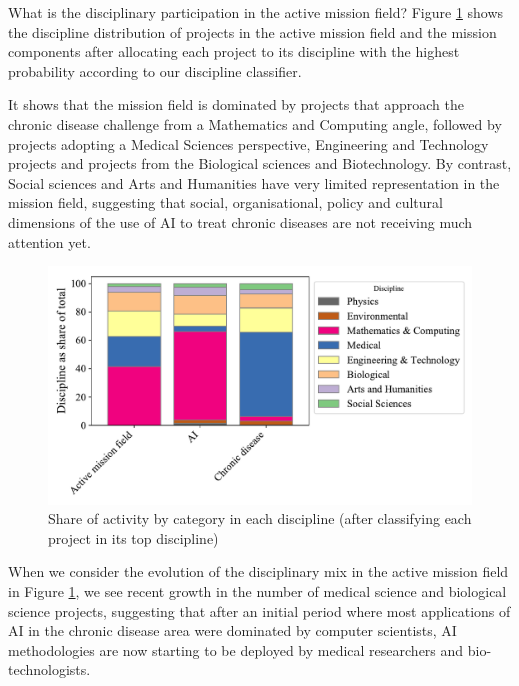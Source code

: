 \documentclass[11pt]{article}
\begin{document}
What is the disciplinary participation in the active mission field?
Figure \ref{fig:disc_mix} shows the discipline distribution of projects in the active mission field and the mission components after allocating each project to its discipline with the highest probability according to our discipline classifier. 

It shows that the mission field is dominated by projects that approach the chronic disease challenge from a Mathematics and Computing angle, followed by projects adopting a Medical Sciences perspective, Engineering and Technology projects and projects from the Biological sciences and Biotechnology. By contrast, Social sciences and Arts and Humanities have very limited representation in the mission field, suggesting that social, organisational, policy and cultural dimensions of the use of AI to treat chronic diseases are not receiving much attention yet.

\begin{figure}[!ht]
    \centering
    \includegraphics[width=\textwidth]{figures/fig_8_disciplines.pdf}
    \caption{Share of activity by category in each discipline (after classifying each project in its top discipline)}
    \label{fig:disc_mix}
\end{figure}

When we consider the evolution of the disciplinary mix in the active mission field in Figure \ref{fig:disc_mix}, we see recent growth in the number of medical science and biological science projects, suggesting that after an initial period where most applications of AI in the chronic disease area were dominated by computer scientists, AI methodologies are now starting to be deployed by medical researchers and bio-technologists.
\end{document}
